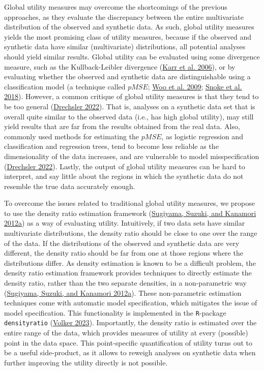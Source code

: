 \documentclass[
]{article}
\begin{document}
Global utility measures may overcome the shortcomings of the previous
approaches, as they evaluate the discrepancy between the entire
multivariate distribution of the observed and synthetic data. As such,
global utility measures yields the most promising class of utility
measures, because if the observed and synthetic data have similar
(multivariate) distributions, all potential analyses should yield
similar results. Global utility can be evaluated using some divergence
measure, such as the Kullback-Leibler divergence
(\protect\hyperlink{ref-karr_utility_2006}{Karr et al. 2006}), or by
evaluating whether the observed and synthetic data are distinguishable
using a classification model (a technique called \(pMSE\);
\protect\hyperlink{ref-Woo_global_2009}{Woo et al. 2009};
\protect\hyperlink{ref-snoke_utility_2018}{Snoke et al. 2018}). However,
a common critique of global utility measures is that they tend to be too
general (\protect\hyperlink{ref-drechsler_utility_2022}{Drechsler
2022}). That is, analyses on a synthetic data set that is overall quite
similar to the observed data (i.e., has high global utility), may still
yield results that are far from the results obtained from the real data.
Also, commonly used methods for estimating the \(pMSE\), as logistic
regression and classification and regression trees, tend to become less
reliable as the dimensionality of the data increases, and are vulnerable
to model misspecification
(\protect\hyperlink{ref-drechsler_utility_2022}{Drechsler 2022}).
Lastly, the output of global utility measures can be hard to interpret,
and say little about the regions in which the synthetic data do not
resemble the true data accurately enough.

To overcome the issues related to traditional global utility measures,
we propose to use the density ratio estimation framework
(\protect\hyperlink{ref-sugiyama_suzuki_kanamori_2012}{Sugiyama, Suzuki,
and Kanamori 2012a}) as a way of evaluating utility. Intuitively, if two
data sets have similar multivariate distributions, the density ratio
should be close to one over the range of the data. If the distributions
of the observed and synthetic data are very different, the density ratio
should be far from one at those regions where the distributions differ.
As density estimation is known to be a difficult problem, the density
ratio estimation framework provides techniques to directly estimate the
density ratio, rather than the two separate densities, in a
non-parametric way
(\protect\hyperlink{ref-sugiyama_suzuki_kanamori_2012}{Sugiyama, Suzuki,
and Kanamori 2012a}). These non-parametric estimation techniques come
with automatic model specification, which mitigates the issue of model
specification. This functionality is implemented in the
\texttt{R}-package \texttt{densityratio}
(\protect\hyperlink{ref-densityratio}{Volker 2023}). Importantly, the
density ratio is estimated over the entire range of the data, which
provides measures of utility at every (possible) point in the data
space. This point-specific quantification of utility turns out to be a
useful side-product, as it allows to reweigh analyses on synthetic data
when further improving the utility directly is not possible.
\end{document}
